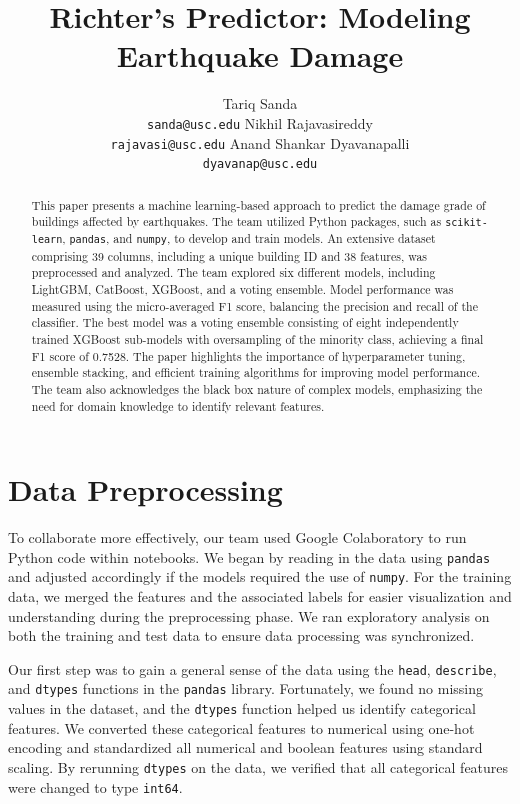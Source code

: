 \documentclass{article}
\title{Richter's Predictor: Modeling Earthquake Damage}
\author{
  Tariq Sanda \\
  \texttt{sanda@usc.edu}
  \And
  Nikhil Rajavasireddy \\
  \texttt{rajavasi@usc.edu}
  \And
  Anand Shankar Dyavanapalli \\
  \texttt{dyavanap@usc.edu}
}
\begin{document}
\maketitle

\begin{abstract}
    This paper presents a machine learning-based approach to predict the damage grade of buildings affected by earthquakes.
    The team utilized Python packages, such as \texttt{scikit-learn}, \texttt{pandas}, and \texttt{numpy}, to develop and train models.
    An extensive dataset comprising 39 columns, including a unique building ID and 38 features, was preprocessed and analyzed.
    The team explored six different models, including LightGBM, CatBoost, XGBoost, and a voting ensemble.
    Model performance was measured using the micro-averaged F1 score, balancing the precision and recall of the classifier.
    The best model was a voting ensemble consisting of eight independently trained XGBoost sub-models with oversampling of the minority class, achieving a final F1 score of 0.7528.
    The paper highlights the importance of hyperparameter tuning, ensemble stacking, and efficient training algorithms for improving model performance.
    The team also acknowledges the black box nature of complex models, emphasizing the need for domain knowledge to identify relevant features.
\end{abstract}


\section{Data Preprocessing}

To collaborate more effectively, our team used Google Colaboratory to run Python code within notebooks.
We began by reading in the data using \texttt{pandas} and adjusted accordingly if the models required the use of \texttt{numpy}.
For the training data, we merged the features and the associated labels for easier visualization and understanding during the preprocessing phase.
We ran exploratory analysis on both the training and test data to ensure data processing was synchronized.

Our first step was to gain a general sense of the data using the \texttt{head}, \texttt{describe}, and \texttt{dtypes} functions in the \texttt{pandas} library.
Fortunately, we found no missing values in the dataset, and the \texttt{dtypes} function helped us identify categorical features.
We converted these categorical features to numerical using one-hot encoding and standardized all numerical and boolean features using standard scaling.
By rerunning \texttt{dtypes} on the data, we verified that all categorical features were changed to type \texttt{int64}.
\end{document}
